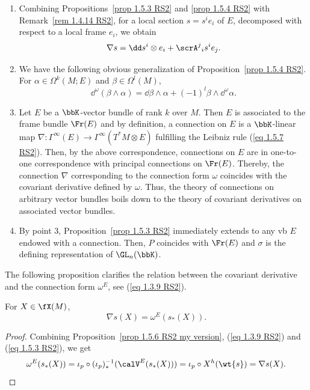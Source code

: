 \begin{rem}\label{rem 1.5.5 RS2}
    \begin{enumerate}
        \item Combining Propositions~\ref{prop 1.5.3 RS2} and \ref{prop 1.5.4 RS2} with Remark~\ref{rem 1.4.14 RS2}, for a local section $s=s^ie_i$ of $E$, decomposed with respect to a local frame $e_i$, we obtain
        \[\nabla s=\dd s^i\otimes e_i+\scrA^j{}_i s^i e_j.\label{eq 1.5.8 RS2}\]
        \item We have the following obvious generalization of Proposition~\ref{prop 1.5.4 RS2}. For $\alpha\in\Omega^k(M;E)$ and $\beta\in\Omega^l(M)$,
        \[\dd^\omega(\beta\wedge\alpha)=\dd\beta\wedge\alpha+(-1)^l\beta\wedge\dd^\omega \alpha.\]
        \item Let $E$ be a $\bbK$-vector bundle of rank $k$ over $M$. Then $E$ is associated to the frame bundle $\Fr(E)$ and by definition, a connection on $E$ is a $\bbK$-linear map $\nabla:\Gamma^\infty(E)\to \Gamma^\infty(T^\ast M\otimes E)$ fulfilling the Leibniz rule (\ref{eq 1.5.7 RS2}). Then, by the above correspondence, connections on $E$ are in one-to-one correspondence with principal connections on $\Fr(E)$. Thereby, the connection $\nabla$ corresponding to the connection form $\omega$ coincides with the covariant derivative defined by $\omega$. Thus, the theory of connections on arbitrary vector bundles boils down to the theory of covariant derivatives on associated vector bundles.
        \item By point 3, Proposition~\ref{prop 1.5.3 RS2} immediately extends to any \gls{vb} $E$ endowed with a connection. Then, $P$ coincides with $\Fr(E)$ and $\sigma$ is the defining representation of $\GL_n(\bbK)$.
    \end{enumerate}
\end{rem}

The following proposition clarifies the relation between the covariant derivative and the connection form $\omega^E$, see (\ref{eq 1.3.9 RS2}).

\begin{prop}[{{\cite[Prop.~1.5.6]{RS2}}}]\label{prop 1.5.6 RS2}
    For $X\in\fX(M)$,
    \[\nabla s(X)=\omega^E(s_\ast(X)).\]
\end{prop}
\begin{proof}
    Combining Proposition~\ref{prop 1.5.6 RS2 my version}, (\ref{eq 1.3.9 RS2}) and (\ref{eq 1.5.3 RS2}), we get
    \[\omega^E(s_\ast(X))=\iota_p\circ (\iota_p)_\ast^{-1}(\calV^E(s_\ast(X)))=\iota_p\circ X^h(\wt{s})=\nabla s(X).\]
\end{proof}

